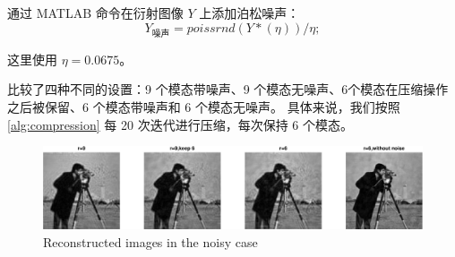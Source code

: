 \documentclass[12pt]{article}
\begin{document}
通过 MATLAB 命令在衍射图像 $Y$ 上添加泊松噪声：
$$
Y_{噪声}=poissrnd(Y*(\eta))/\eta;
$$

这里使用 $\eta=0.0675$。

比较了四种不同的设置：9 个模态带噪声、9 个模态无噪声、6个模态在压缩操作之后被保留、6 个模态带噪声和 6 个模态无噪声。 具体来说，我们按照 \ref{alg:compression} 每 20 次迭代进行压缩，每次保持 6 个模态。

\begin{figure}
	\centering
	\includegraphics[width=1\linewidth]{../figures/noise_u.eps}
	\caption{Reconstructed images in the noisy case}
	
	\label{fig:noise_u}
	
\end{figure}
\end{document}
